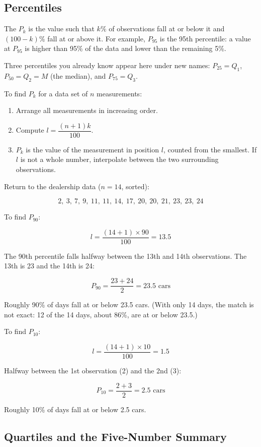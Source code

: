 \subsection*{Percentiles}

The  $P_k$ is the value
such that $k\%$ of observations fall at or below it and $(100-k)\%$
fall at or above it. For example, $P_{95}$ is the 95th percentile:
a value at $P_{95}$ is higher than 95\% of the data and lower than
the remaining 5\%.

Three percentiles you already know appear here under new names:
$P_{25} = Q_1$, $P_{50} = Q_2 = M$ (the median), and $P_{75} = Q_3$.

To find $P_k$ for a data set of $n$ measurements:

\begin{enumerate}
    \item Arrange all measurements in increasing order.
    \item Compute $l = \dfrac{(n+1)k}{100}$.
    \item $P_k$ is the value of the measurement in position $l$,
    counted from the smallest. If $l$ is not a whole number,
    interpolate between the two surrounding observations.
\end{enumerate}

Return to the dealership data ($n = 14$, sorted):

\[ 2,\ 3,\ 7,\ 9,\ 11,\ 11,\ 14,\ 17,\ 20,\ 20,\ 21,\ 23,\ 23,\ 24 \]

To find $P_{90}$:

\[
l = \frac{(14+1) \times 90}{100} = 13.5
\]

The 90th percentile falls halfway between the 13th and 14th
observations. The 13th is 23 and the 14th is 24:

\[
P_{90} = \frac{23 + 24}{2} = 23.5 \text{ cars}
\]

Roughly 90\% of days fall at or below 23.5 cars. (With only 14 days, the
match is not exact: 12 of the 14 days, about 86\%, are at or below
23.5.)

To find $P_{10}$:

\[
l = \frac{(14+1) \times 10}{100} = 1.5
\]

Halfway between the 1st observation (2) and the 2nd (3):

\[
P_{10} = \frac{2 + 3}{2} = 2.5 \text{ cars}
\]

Roughly 10\% of days fall at or below 2.5 cars.

\subsection*{Quartiles and the Five-Number Summary}

